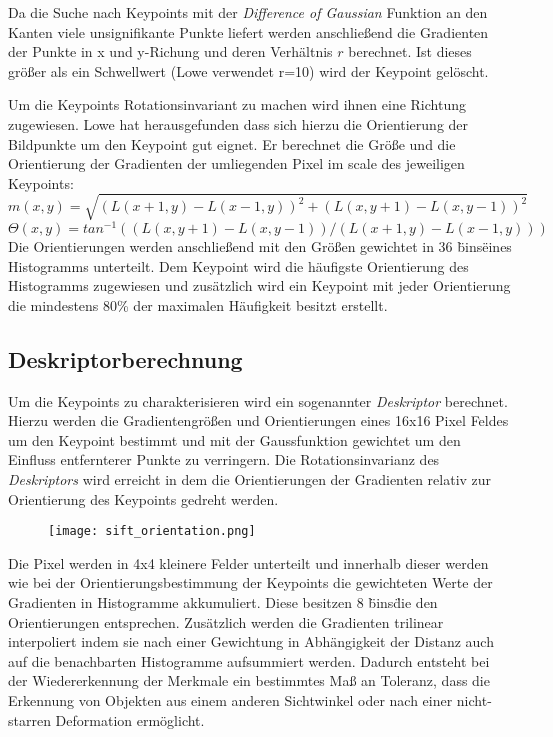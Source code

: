 Da die Suche nach Keypoints mit der \emph{Difference of Gaussian} Funktion an den Kanten viele unsignifikante Punkte liefert werden anschließend die Gradienten der Punkte in x und y-Richung und deren Verhältnis $ r $ berechnet. Ist dieses größer als ein Schwellwert (Lowe verwendet r=10) wird der Keypoint gelöscht.

Um die Keypoints Rotationsinvariant zu machen wird ihnen eine Richtung zugewiesen. Lowe hat herausgefunden dass sich hierzu die Orientierung der Bildpunkte um den Keypoint gut eignet. 
Er berechnet die Größe und die Orientierung der Gradienten der umliegenden Pixel im \Gls{scale} des jeweiligen Keypoints:
\begin{equation}
m(x, y) = \sqrt{(L(x + 1, y) - L(x - 1, y))^{2} + (L(x, y + 1) - L(x, y - 1))^{2}}
\end{equation}
\begin{equation}
\Theta (x, y) = tan^{-1}((L(x, y + 1) - L(x, y - 1))/(L(x + 1, y) - L(x - 1, y)))
\end{equation}
Die Orientierungen werden anschließend mit den Größen gewichtet in 36 \"bins\" eines Histogramms unterteilt. Dem Keypoint wird die häufigste Orientierung des Histogramms zugewiesen und zusätzlich wird ein Keypoint mit jeder Orientierung die mindestens 80\% der maximalen Häufigkeit besitzt erstellt.

\subsection{Deskriptorberechnung}

Um die Keypoints zu charakterisieren wird ein sogenannter \emph{Deskriptor} berechnet.
Hierzu werden die Gradientengrößen und Orientierungen eines 16x16 Pixel Feldes um den Keypoint bestimmt und mit der Gaussfunktion gewichtet um den Einfluss entfernterer Punkte zu verringern.
Die Rotationsinvarianz des \emph{Deskriptors} wird erreicht in dem die Orientierungen der Gradienten relativ zur Orientierung des Keypoints gedreht werden.

\begin{figure}[h]
\texttt{[image: sift\_orientation.png]}
\centering
\end{figure}

Die Pixel werden in 4x4 kleinere Felder unterteilt und innerhalb dieser werden wie bei der Orientierungsbestimmung der Keypoints die gewichteten Werte der Gradienten in Histogramme akkumuliert. Diese besitzen 8 \"bins\" die den Orientierungen entsprechen. Zusätzlich werden die Gradienten trilinear interpoliert indem sie nach einer Gewichtung in Abhängigkeit der Distanz auch auf die benachbarten Histogramme aufsummiert werden. Dadurch entsteht bei der Wiedererkennung der Merkmale ein bestimmtes Maß an Toleranz, dass die Erkennung von Objekten aus einem anderen Sichtwinkel oder nach einer nicht-starren Deformation ermöglicht.


